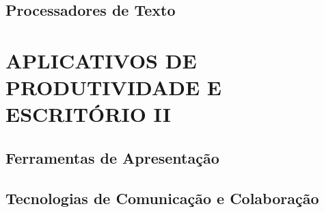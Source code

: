 \documentclass[
]{book}
\begin{document}
\section{Processadores de Texto}\label{processadores-de-texto}

\chapter{APLICATIVOS DE PRODUTIVIDADE E ESCRITÓRIO II}\label{aplicativos-de-produtividade-e-escrituxf3rio-ii}

\section{Ferramentas de Apresentação}\label{ferramentas-de-apresentauxe7uxe3o}

\section{Tecnologias de Comunicação e Colaboração}\label{tecnologias-de-comunicauxe7uxe3o-e-colaborauxe7uxe3o}

  
\end{document}

